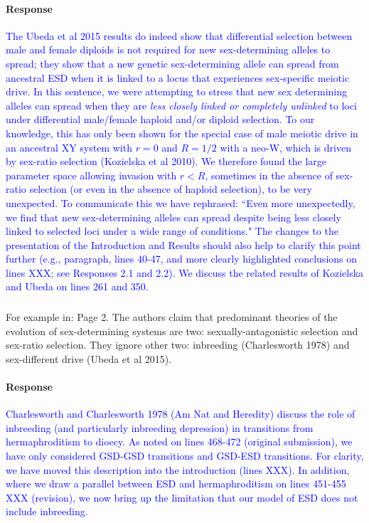 \documentclass[10pt,letterpaper]{article}
\begin{document}
\noindent\paragraph{Response}
\textcolor{blue}{The Ubeda et al 2015 results do indeed show that differential selection between male and female diploids is not required for new sex-determining alleles to spread; they show that a new genetic sex-determining allele can spread from ancestral ESD when it is linked to a locus that experiences sex-specific meiotic drive. 
In this sentence, we were attempting to stress that new sex determining alleles can spread when they are \textit{less closely linked or completely unlinked} to loci under differential male/female haploid and/or diploid selection. 
To our knowledge, this has only been shown for the special case of male meiotic drive in an ancestral XY system with $r=0$ and $R=1/2$ with a neo-W, which is driven by sex-ratio selection (Kozielska et al 2010). 
We therefore found the large parameter space allowing invasion with $r<R$, sometimes in the absence of sex-ratio selection (or even in the absence of haploid selection), to be very unexpected.
}
\textcolor{blue}{To communicate this we have rephrased: ``Even more unexpectedly, we find that new sex-determining alleles can spread despite being less closely linked to selected loci under a wide range of conditions." 
The changes to the presentation of the Introduction and Results should also help to clarify this point further (e.g., paragraph, lines 40-47, and more clearly highlighted conclusions on lines XXX; see Responses 2.1 and 2.2).  }
\textcolor{blue}{We discuss the related results of Kozielska and Ubeda on lines 261 and 350.}

\noindent\subsubsection{}
For example in: Page 2. The authors claim that predominant theories of the evolution of sex-determining systems are two: sexually-antagonistic selection and sex-ratio selection. They ignore other two: inbreeding (Charlesworth 1978) and sex-different drive (Ubeda et al 2015). 

\noindent\paragraph{Response}
\textcolor{blue}{
Charlesworth and Charlesworth 1978 (Am Nat and Heredity) discuss the role of inbreeding (and particularly inbreeding depression) in transitions from hermaphroditism to dioecy. 
As noted on lines 468-472 (original submission), we have only considered GSD-GSD transitions and GSD-ESD transitions.
For clarity, we have moved this description into the introduction (lines XXX). 
In addition, where we draw a parallel between ESD and hermaphroditism on lines 451-455 XXX (revision), we now bring up the limitation that our model of ESD does not include inbreeding. }
\end{document}

